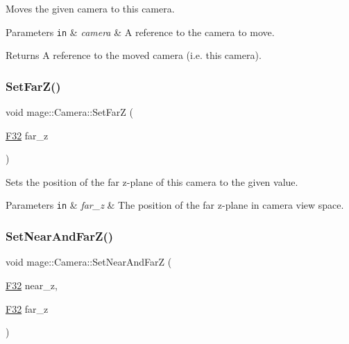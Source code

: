 Moves the given camera to this camera.


\begin{DoxyParams}[1]{Parameters}
\mbox{\tt in}  & {\em camera} & A reference to the camera to move. \\
\hline
\end{DoxyParams}
\begin{DoxyReturn}{Returns}
A reference to the moved camera (i.\+e. this camera). 
\end{DoxyReturn}
\hypertarget{classmage_1_1_camera_aa49995ef824eeb807656921406d248a5}{}\label{classmage_1_1_camera_aa49995ef824eeb807656921406d248a5} 
\subsubsection{\texorpdfstring{Set\+Far\+Z()}{SetFarZ()}}
{\footnotesize\ttfamily void mage\+::\+Camera\+::\+Set\+FarZ (\begin{DoxyParamCaption}\item[{\hyperlink{namespacemage_aa97e833b45f06d60a0a9c4fc22ae02c0}{F32}}]{far\+\_\+z }\end{DoxyParamCaption})\hspace{0.3cm}{\ttfamily [noexcept]}}

Sets the position of the far z-\/plane of this camera to the given value.


\begin{DoxyParams}[1]{Parameters}
\mbox{\tt in}  & {\em far\+\_\+z} & The position of the far z-\/plane in camera view space. \\
\hline
\end{DoxyParams}
\hypertarget{classmage_1_1_camera_aa075b0f6f30376217c0058a70df9d845}{}\label{classmage_1_1_camera_aa075b0f6f30376217c0058a70df9d845} 
\subsubsection{\texorpdfstring{Set\+Near\+And\+Far\+Z()}{SetNearAndFarZ()}}
{\footnotesize\ttfamily void mage\+::\+Camera\+::\+Set\+Near\+And\+FarZ (\begin{DoxyParamCaption}\item[{\hyperlink{namespacemage_aa97e833b45f06d60a0a9c4fc22ae02c0}{F32}}]{near\+\_\+z,  }\item[{\hyperlink{namespacemage_aa97e833b45f06d60a0a9c4fc22ae02c0}{F32}}]{far\+\_\+z }\end{DoxyParamCaption})\hspace{0.3cm}{\ttfamily [noexcept]}}

